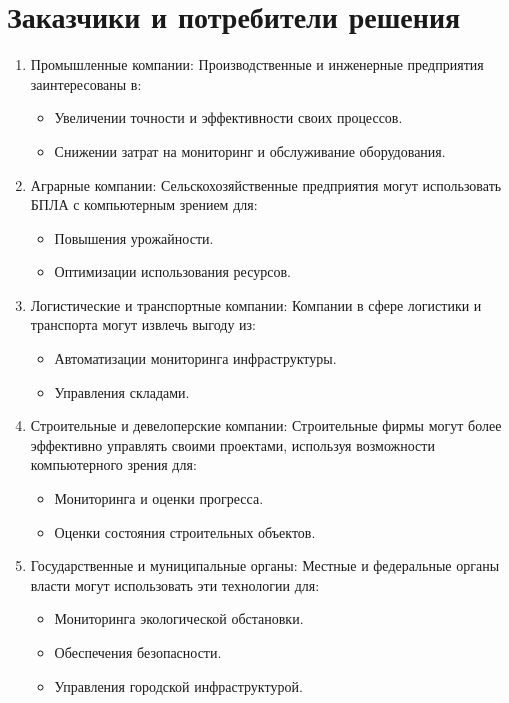     \section*{Заказчики и потребители решения}
    
    \begin{enumerate}
        \item Промышленные компании:
        Производственные и инженерные предприятия заинтересованы в:
        \begin{itemize}
            \item Увеличении точности и эффективности своих процессов.
            \item Снижении затрат на мониторинг и обслуживание оборудования.
        \end{itemize}
        
        \item Аграрные компании:
        Сельскохозяйственные предприятия могут использовать БПЛА с компьютерным зрением для:
        \begin{itemize}
            \item Повышения урожайности.
            \item Оптимизации использования ресурсов.
        \end{itemize}
        
        \item Логистические и транспортные компании:
        Компании в сфере логистики и транспорта могут извлечь выгоду из:
        \begin{itemize}
            \item Автоматизации мониторинга инфраструктуры.
            \item Управления складами.
        \end{itemize}
        
        \item Строительные и девелоперские компании:
        Строительные фирмы могут более эффективно управлять своими проектами, используя возможности компьютерного зрения для:
        \begin{itemize}
            \item Мониторинга и оценки прогресса.
            \item Оценки состояния строительных объектов.
        \end{itemize}
        
        \item Государственные и муниципальные органы:
        Местные и федеральные органы власти могут использовать эти технологии для:
        \begin{itemize}
            \item Мониторинга экологической обстановки.
            \item Обеспечения безопасности.
            \item Управления городской инфраструктурой.
        \end{itemize}
        

\end{enumerate}
